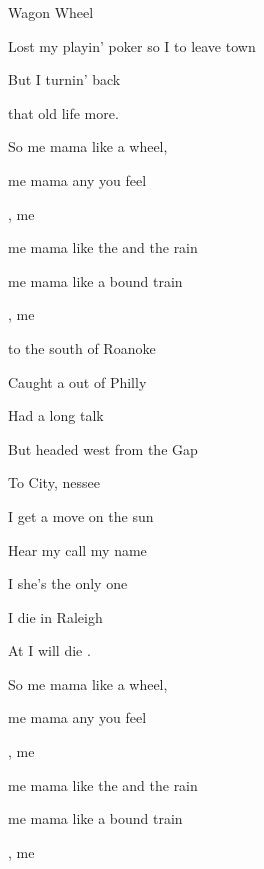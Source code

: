 \begin{SBSong}{Wagon Wheel}
\begin{SBVerse}
    Lost my  playin' poker so I  to leave town
    
    But I  turnin' back
    
     that old life  more.
  \end{SBVerse} 
  \begin{SBChorus}  
    So  me mama like a  wheel,
    
     me mama any you feel
    
    ,   me
    
     me mama like the  and the rain
    
     me mama like a bound train
    
    ,  me

  \end{SBChorus} 
  
  \begin{SBVerse}  
     to the south  of Roanoke
    
    Caught a  out of Philly
    
    Had a  long talk
    
    But  headed west from the  Gap
    
    To  City, nessee
  \end{SBVerse} 
  \begin{SBVerse}   
    I  get a move on  the sun
    
    Hear my  call my name
    
    I  she's the only one
    
     I die in Raleigh
    
    At  I will die .
  \end{SBVerse} 
  \begin{SBChorus}   
    So  me mama like a  wheel,
    
     me mama any  you feel
    
    ,   me
    
     me mama like the  and the rain
    
    me mama like a bound train
    
    ,  me 
    
  \end{SBChorus}
\end{SBSong}

